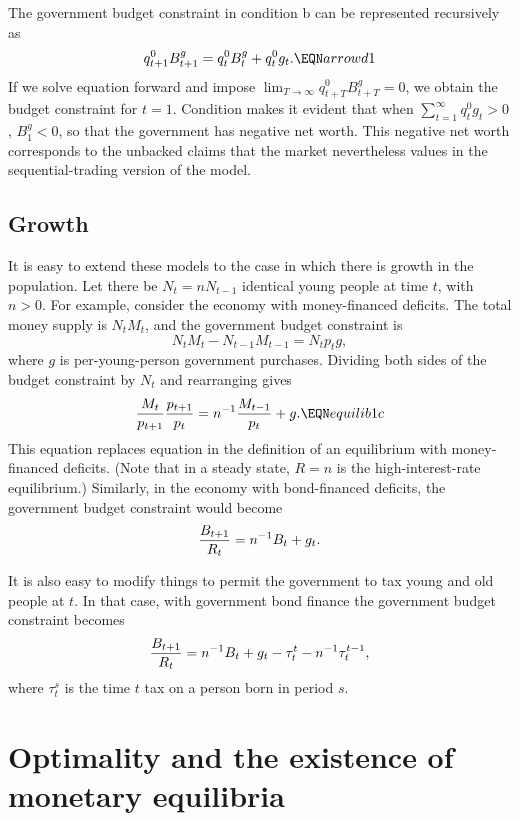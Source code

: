  The government budget constraint in condition b
can be represented recursively as
$$ q^0_{t+1} B_{t+1}^g = q_t^0 B_t^g + q_t^0 g_t.\EQN arrowd1  $$
If we solve equation  forward and impose
$\lim_{T \rightarrow \infty} q^0_{t+T} B^g_{t+T} = 0$, we obtain
the budget constraint   for $t=1$.
Condition  makes it evident that
when $\sum_{t=1}^\infty q_t^0 g_t >0$, $B_1^g < 0$, so that the
government has negative net worth.  This negative net worth
corresponds to  the unbacked
claims that the market nevertheless values in the sequential-trading
version of the model.

\subsection{Growth}

  It is easy to extend these models to the case  in which  there is
growth in the population.  Let there be $N_t = n N_{t-1}$ identical young
people at time $t$, with $n > 0$.   For example, consider the economy
with money-financed deficits.  The total money supply
is $N_t M_t$, and the government budget constraint is
$$ N_t M_t - N_{t-1} M_{t-1} = N_t p_t g, $$
where $g$ is per-young-person government   purchases.
Dividing both sides of the budget constraint by
$ N_t$ and rearranging gives
$$ {M_t \over p_{t+1}} { p_{t+1} \over p_t} = n^{-1} {M_{t-1} \over p_t}
     + g .\EQN equilib1c  $$
This equation replaces equation  in the definition of
an equilibrium with money-financed deficits.  (Note that
in a steady state, $R=n$ is the high-interest-rate equilibrium.)
Similarly, in the economy with bond-financed deficits,
the government budget constraint would become
$$ {B_{t+1} \over R_t} = n^{-1} B_t + g_t .$$

  It is also easy to modify things to permit the government to
tax young and old people at $t$.  In that case, with government
bond finance the government budget constraint
becomes
$$ {B_{t+1} \over R_t} = n^{-1} B_t + g_t - \tau^t_t - n^{-1} \tau^{t-1}_t ,$$
where $\tau^s_t$ is the time $t$ tax on a person born in period $s$.


\section{Optimality and the existence of monetary equilibria}

